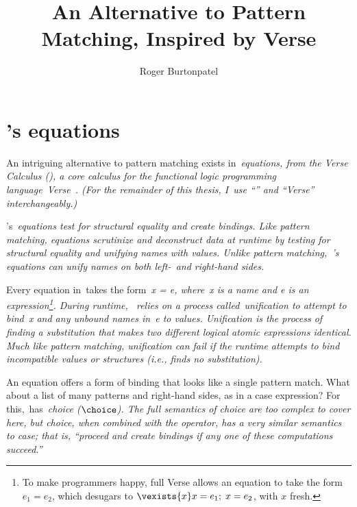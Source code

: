 \documentclass[manuscript,screen 12pt, nonacm]{acmart}
\title{An Alternative to Pattern Matching, Inspired by Verse}
\author{Roger Burtonpatel}
\affiliation{%
  \institution{Tufts University}
  \streetaddress{419 Boston Ave}
  \city{Medford}
  \state{Massachusetts}
  \country{USA}
  \postcode{02155}
}
\begin{document}
    
    \section{\VC's equations}
    \label{verseoverobservers}

    An intriguing alternative to pattern matching exists in~\it{equations}, from
    the Verse Calculus (\VC), a core calculus for the functional logic
    programming language~\it{Verse}~\citep{antoy2010functional,
    hanus2013functional, verse}. (For the remainder of this thesis, I~use “\VC”
    and “Verse” interchangeably.)



    \VC's~\it{equations} test for structural equality and create bindings. Like
    pattern matching, equations scrutinize and deconstruct data at runtime by
    testing for structural equality and unifying names with values. Unlike
    pattern matching,~\VC's equations can unify names on both left-~\it{and}
    right-hand sides. 

    Every equation in~\VC takes the form~\it{x = e}, where~\it{x} is a name and
    \it{e} is an expression\footnote{To make programmers happy, full Verse
    allows an equation to take the form $e_{1} = e_{2}$, which desugars to
    $\vexists{x} x = e_{1};\; x = e_{2}$, with $x$ fresh.}. During runtime,~\VC
    relies on a process called~\it{unification} to attempt to bind~\it{x} and
    any unbound names in~\it{e} to values. Unification is the process of finding
    a substitution that makes two different logical atomic expressions
    identical. Much like pattern matching, unification can fail if the runtime
    attempts to bind incompatible values or structures (i.e., finds no
    substitution). 

    An equation offers a form of binding that looks like a single pattern match.
    What about a list of many patterns and right-hand sides, as in a case
    expression? For this,~\VC has~\it{choice} ($\choice$). The full semantics of
    choice are too complex to cover here, but choice, when combined with the
    \one operator, has a very similar semantics to case; that is, “proceed
    and create bindings if any one of these computations succeed.” 
\end{document}
